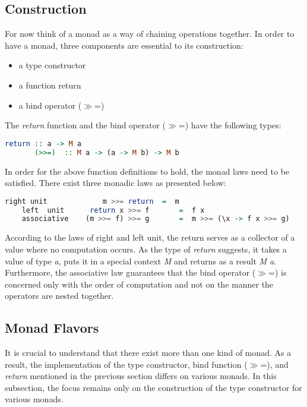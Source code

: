 \documentclass[a4paper, onecolumn]{article}
\begin{document}
    \subsection{Construction}
    For now think of a monad as a way of chaining operations together. 
    In order to have a monad, three components are essential to its construction: 
    \begin{itemize}
        \item a type constructor
        \item a function return
        \item a bind operator ($\gg$=)
    \end{itemize}
    \noindent The \textit{return} function and the bind operator ($\gg$=) have the following types: 
    \begin{tcolorbox}
      \begin{lstlisting}[language=Haskell]
       return :: a -> M a 
       (>>=)  :: M a -> (a -> M b) -> M b 
      \end{lstlisting}
    \end{tcolorbox}
    \noindent In order for the above function definitions to hold, the monad laws need to be satisfied. There exist three monadic laws as presented below: 
    \begin{tcolorbox}
      \begin{lstlisting}[language=Haskell]
    right unit             m >>= return  =  m 
    left  unit      return x >>= f       =  f x   
    associative    (m >>= f) >>= g       =  m >>= (\x -> f x >>= g) 
      \end{lstlisting}
    \end{tcolorbox}
    \noindent According to the laws of right and left unit, the return serves as a collector of a value where no computation occurs. As the type of \textit{return} suggests, it takes a value of type \textit{a}, puts it in a special context \textit{M} and returns as a result \textit{M a}. Furthermore, the associative law guarantees that the bind operator ($\gg$=) is concerned only with the order of computation and not on the manner the operators are nested together.
    \subsection{Monad Flavors}
    
    It is crucial to understand that there exist more than one kind of monad. As a result, the implementation of the type constructor, bind function ($\gg$=), and \textit{return} mentioned in the previous section differs on various monads. In this subsection, the focus remains only on the construction of the type constructor for various monads.
    
\end{document}
